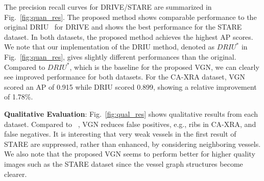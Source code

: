 \documentclass[runningheads,a4paper]{llncs}
\begin{document}
The precision recall curves for DRIVE/STARE are summarized in Fig.~\ref{fig:quan_res}. The proposed method shows comparable performance to the original DRIU~\cite{maninis16} for DRIVE and shows the best performance for the STARE dataset. In both datasets, the proposed method achieves the highest AP scores. We note that our implementation of the DRIU method, denoted as $DRIU^{*}$ in Fig.~\ref{fig:quan_res}, gives slightly different performances than the original. Compared to $DRIU^{*}$, which is the baseline for the proposed VGN, we can clearly see improved performance for both datasets. For the CA-XRA dataset, VGN scored an AP of 0.915 while DRIU scored 0.899, showing a relative improvement of 1.78\%.

\textbf{Qualitative Evaluation}:
Fig.~\ref{fig:qual_res} shows qualitative results from each dataset. Compared to ~\cite{maninis16}, VGN reduces false positives, e.g., ribs in CA-XRA, and false negatives. It is interesting that very weak vessels in the first result of STARE are suppressed, rather than enhanced, by considering neighboring vessels. We also note that the proposed VGN seems to perform better for higher quality images such as the STARE dataset since the vessel graph structures become clearer.
\end{document}
